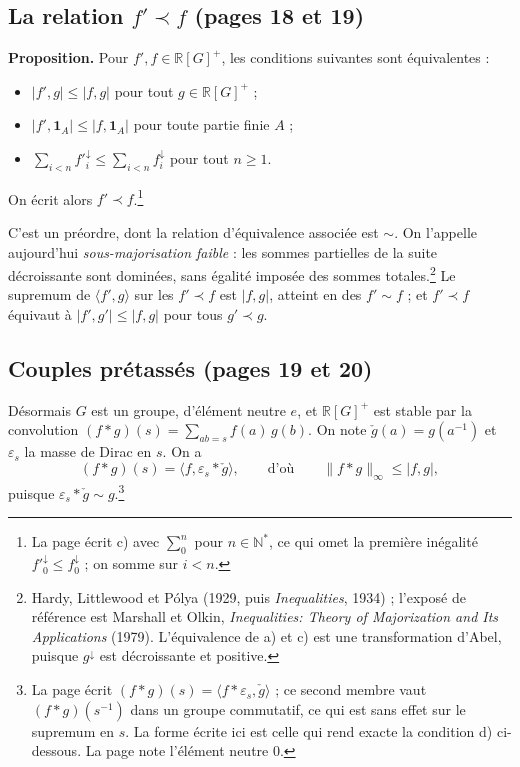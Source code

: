 \documentclass[11pt,a4paper]{article}
\begin{document}
\subsection*{La relation $f' \prec f$ (pages 18 et 19)}

\textbf{Proposition.} Pour $f', f \in \mathbb{R}[G]^+$, les conditions
suivantes sont équivalentes :
\begin{itemize}
  \item[a)] $|f', g| \leqslant |f, g|$ pour tout $g \in \mathbb{R}[G]^+$ ;
  \item[b)] $|f', \mathbf{1}_A| \leqslant |f, \mathbf{1}_A|$ pour toute partie
  finie $A$ ;
  \item[c)] $\sum_{i < n} f'^{\downarrow}_i \leqslant \sum_{i < n}
  f^{\downarrow}_i$ pour tout $n \geqslant 1$.
\end{itemize}
On écrit alors $f' \prec f$.\footnote{La page écrit c) avec
$\sum_0^n$ pour $n \in \mathbb{N}^*$, ce qui omet la première inégalité
$f'^{\downarrow}_0 \leqslant f^{\downarrow}_0$ ; on somme sur $i < n$.}

C'est un préordre, dont la relation d'équivalence associée est $\sim$. On
l'appelle aujourd'hui \emph{sous-majorisation faible} : les sommes partielles
de la suite décroissante sont dominées, sans égalité imposée des sommes
totales.\footnote{Hardy, Littlewood et Pólya (1929, puis \emph{Inequalities},
1934) ; l'exposé de référence est Marshall et Olkin, \emph{Inequalities:
Theory of Majorization and Its Applications} (1979). L'équivalence de a) et
c) est une transformation d'Abel, puisque $g^{\downarrow}$ est décroissante et
positive.} Le supremum de $\langle f', g \rangle$ sur les $f' \prec f$ est
$|f, g|$, atteint en des $f' \sim f$ ; et $f' \prec f$ équivaut à
$|f', g'| \leqslant |f, g|$ pour tous $g' \prec g$.

\subsection*{Couples prétassés (pages 19 et 20)}

Désormais $G$ est un groupe, d'élément neutre $e$, et $\mathbb{R}[G]^+$ est
stable par la convolution
$(f * g)(s) = \sum_{ab = s} f(a)\, g(b)$. On note
$\check g(a) = g(a^{-1})$ et $\varepsilon_s$ la masse de Dirac en $s$. On a
\[
(f * g)(s) = \langle f, \varepsilon_s * \check g \rangle ,
\qquad\text{d'où}\qquad
\|f * g\|_\infty \leqslant |f, g| ,
\]
puisque $\varepsilon_s * \check g \sim g$.\footnote{La page écrit
$(f * g)(s) = \langle f * \varepsilon_s, \check g \rangle$ ; ce second membre
vaut $(f * g)(s^{-1})$ dans un groupe commutatif, ce qui est sans effet sur le
supremum en $s$. La forme écrite ici est celle qui rend exacte la condition
d) ci-dessous. La page note l'élément neutre $0$.}
\end{document}
